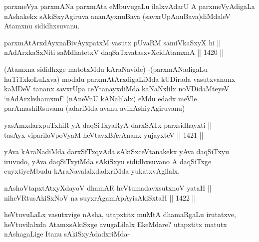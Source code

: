 \begin{artha}
parxmeVya parxmANa parxmAta eMbuvugaLu ilalxvAdarU A parxmeVyAdigaLa nAshakekx sAkiSxyAgiruva ananAyxnuBava (savxrUpAnuBava)diMdaleV Atamxnu sididhxsuvanu.
\end{artha}

\begin{shl}
parxmAtArxdAyxnaBivAyxpatxM vasutx pUvaRM samiVkaSxyX hi || \\
nAdArxkaSxNiti saMdhatetxV daqSaTxvatasxvXcidAtamxnA \hfill || 1420 ||  
\end{shl}

\begin{artha}
(Atamxna sididhxge matotxMdu kAraNavide) -(parxmANadigaLu huTiTxkoLuLxva) modalu parxmAtArxdigaLiMda kUDirada vasutxvanunx kaMDeV tananx savxrUpa ceYtanayxdiMda kaNaNxlilx noVDidaMteyeV `nAdArxkshamxmf' (nAneVnU kANalilalx) eMdu edadx meVle parAmashiRsuvanu (adariMda avanu avinAshiyAgiruvanu)
\end{artha}


\begin{shl}
yasAmxdarxpuTxhiR yA daqSiTxyaRyA darxSATx parxsidhayxti || \\
tasAyx vipariloVpoV\s yaM heVtavxBAvAnanx yujayxteV \hfill || 1421 ||  
\end{shl}

\begin{artha}
yAva kAraNadiMda darxSfTxqvAda sAkiSxceVtanakekx yAva daqSiTxyu iruvudo, yAva daqSiTxyiMda sAkiSxyu sididhxsuvano A daqSiTxge cuyxtiyeMbudu kAraNavalalxdadxriMda yukatxvAgilalx.
\end{artha}


\begin{shl}
nAshoVtapxtAtxyXdayoV dhamAR heVtumadavxsutxnoV yataH || \\
niheVRtusAkiSxNoV na suyxrAgamApAyisAkiSxtaH \hfill || 1422 ||  
\end{shl}

\begin{artha}
heVtuvuLaLx vasutxvige nAsha, utapxtitx muMtA dhamaRgaLu irutatxve, heVtuvilalxda AtamxsAkiSxge avugaLilalx EkeMdare? utapxtitx matutx nAshagaLige Itanu sAkiSxyAdadxriMda-
\end{artha}


